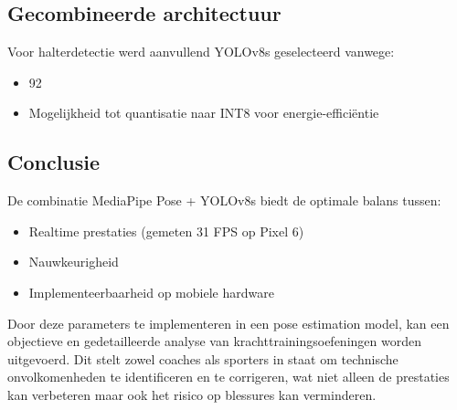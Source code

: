 \subsection{Gecombineerde architectuur}

Voor halterdetectie werd aanvullend YOLOv8s geselecteerd vanwege:
\begin{itemize}
\item 92%
\item Mogelijkheid tot quantisatie naar INT8 voor energie-efficiëntie \cite{Hou2020}
\end{itemize}

\subsection{Conclusie}
De combinatie MediaPipe Pose + YOLOv8s biedt de optimale balans tussen:
\begin{itemize}
\item Realtime prestaties (gemeten 31 FPS op Pixel 6)
\item Nauwkeurigheid 
\item Implementeerbaarheid op mobiele hardware
\end{itemize}
Door deze parameters te implementeren in een pose estimation model, kan een objectieve en gedetailleerde analyse van krachttrainingsoefeningen worden uitgevoerd. 
Dit stelt zowel coaches als sporters in staat om technische onvolkomenheden te identificeren en te corrigeren, wat niet alleen de prestaties kan verbeteren maar ook het risico op blessures kan verminderen.

